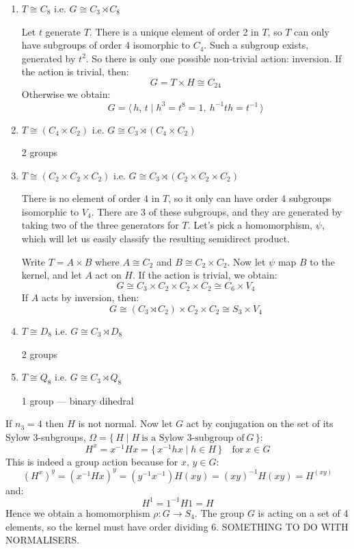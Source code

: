 \begin{enumerate}
    \item \(T \cong C_8\) i.e. \(G \cong C_3 \rtimes C_8\)

        Let \(t\) generate \(T\).
        There is a unique element of order 2 in \(T\), so \(T\) can only have subgroups of order 4 isomorphic to
        \(C_4\).
        Such a subgroup exists, generated by \(t^2\).
        So there is only one possible non-trivial action: inversion.
        If the action is trivial, then:
        \[G = T \times H \cong C_{24}\]
        Otherwise we obtain:
        \[G = \langle\, h,\,t \mid h^3 = t^8 = 1,\ h^{-1}th = t^{-1}\,\rangle\]

    \item \(T \cong (C_4 \times C_2)\) i.e. \(G \cong C_3 \rtimes (C_4 \times C_2)\)

        2 groups
    \item \(T \cong (C_2 \times C_2 \times C_2)\) i.e. \(G \cong C_3 \rtimes (C_2 \times C_2 \times C_2)\)
    
        There is no element of order 4 in \(T\), so it only can have order 4 subgroups isomorphic to \(V_4\).
        There are 3 of these subgroups, and they are generated by taking two of the three generators for \(T\).
        Let's pick a homomorphism, \(\psi\), which will let us easily classify the resulting semidirect product.

        Write \(T = A \times B\) where \(A \cong C_2\) and \(B \cong C_2 \times C_2\).
        Now let \(\psi\) map \(B\) to the kernel, and let \(A\) act on \(H\).
        If the action is trivial, we obtain:
        \[G \cong C_3 \times C_2 \times C_2 \times C_2 \cong C_6 \times V_4\]
        If \(A\) acts by inversion, then:
        \[G \cong (C_3 \rtimes C_2) \times C_2 \times C_2 \cong S_3 \times V_4\]

    \item \(T \cong D_8\) i.e. \(G \cong C_3 \rtimes D_8\)
        
        2 groups
    \item \(T \cong Q_8\) i.e. \(G \cong C_3 \rtimes Q_8\)

        1 group --- binary dihedral
\end{enumerate}

If \(n_3 = 4\) then \(H\) is not normal.
Now let \(G\) act by conjugation on the set of its Sylow 3-subgroups, \(\Omega = \{\,H \mid H\ \text{is a Sylow
3-subgroup of}\ G\,\}\):
\[H^x = x^{-1}Hx = \{\,x^{-1}hx \mid h \in H\,\} \quad \text{for}\ x \in G\]
This is indeed a group action because for \(x,\,y \in G\):
\[{(H^x)}^y = {(x^{-1}Hx)}^y = (y^{-1}x^{-1})H(xy) = {(xy)}^{-1}H(xy) = H^{(xy)}\]
and:
\[H^1 = 1^{-1}H1 = H\]
Hence we obtain a homomorphism \(\rho:G \to S_4\).
The group \(G\) is acting on a set of 4 elements, so the kernel must have order dividing 6.
SOMETHING TO DO WITH NORMALISERS\@.

